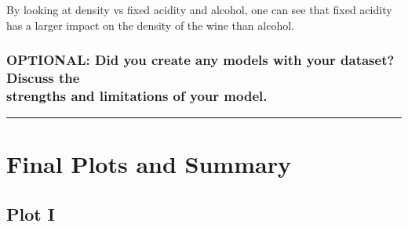 \documentclass[]{article}
\begin{document}
By looking at density vs fixed acidity and alcohol, one can see that
fixed acidity has a larger impact on the density of the wine than
alcohol.

\subsubsection{\texorpdfstring{OPTIONAL: Did you create any models with
your dataset? Discuss the\\
strengths and limitations of your
model.}{OPTIONAL: Did you create any models with your dataset? Discuss the strengths and limitations of your model.}}\label{optional-did-you-create-any-models-with-your-dataset-discuss-the-strengths-and-limitations-of-your-model.}

\begin{center}\rule{0.5\linewidth}{\linethickness}\end{center}

\section{Final Plots and Summary}\label{final-plots-and-summary}

\subsection{Plot I}\label{plot-i}
\end{document}
